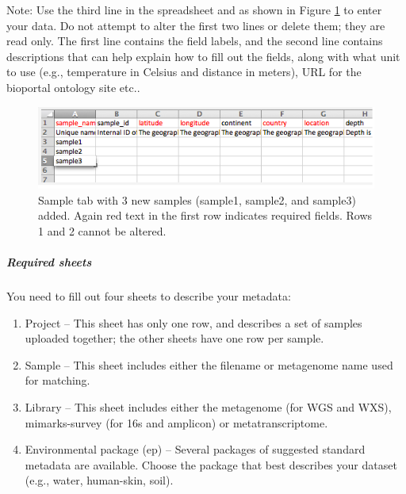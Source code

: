 \documentclass[12pt,fullpage]{report}
\begin{document}
Note: Use the third line in the spreadsheet and as shown in Figure \ref{fig:project-spreadsheet-with-3-samples} to enter your data. Do not attempt to alter the first two lines or delete them; they are read only. The first line contains the field labels, and the second line contains descriptions that can help explain how to fill out the fields, along with what unit to use (e.g., temperature in Celsius and distance in meters), URL for the bioportal ontology site etc..

\begin{figure}[ht]
\begin{center}
\includegraphics[width=6in]{Images/project-spreadsheet-with-3-samples.png}
\end{center}
\caption{
Sample tab with 3 new samples (sample1, sample2, and sample3) added. Again red text in the first row indicates required fields. Rows 1 and 2 cannot be altered.
}
\label{fig:project-spreadsheet-with-3-samples}
\end{figure}

\subparagraph*{Required sheets}
You need to fill out four sheets to describe your metadata:

\begin{enumerate}
\item Project --
This sheet has only one row, and describes a set of samples uploaded together; the other sheets have one row per sample.

\item Sample --
This sheet includes either the filename or metagenome name used for matching.

\item Library --
This sheet includes either the metagenome (for WGS and WXS), mimarks-survey (for \gls{16s} and amplicon) or metatranscriptome.

\item Environmental package (ep) --
Several packages of suggested standard metadata are available.
Choose the package that best describes your dataset (e.g., water, human-skin, soil).

\end{enumerate}
\end{document}
